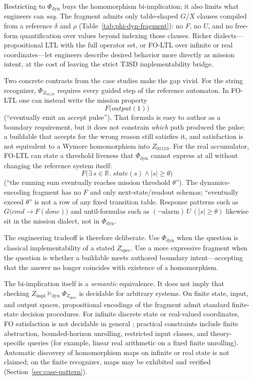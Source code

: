 Restricting to $\Phi_{\mathrm{dyn}}$ buys the homomorphism bi-implication; it also limits what engineers can \emph{say}. The fragment admits only table-shaped $G$/$X$ clauses compiled from a reference $\delta$ and $\rho$ (Table~\ref{tab:phi-dyn-fragment}): no $F$, no $U$, and no free-form quantification over values beyond indexing those clauses. Richer dialects---propositional LTL with the full operator set, or FO-LTL over infinite or real coordinates---let engineers describe desired behavior more directly as mission intent, at the cost of leaving the strict T3SD implementability bridge.

Two concrete contrasts from the case studies make the gap vivid. For the string recognizer, $\Phi_{Z_{01110}}$ requires every guided step of the reference automaton. In FO-LTL one can instead write the mission property
\[
  F\bigl(\mathit{output}(1)\bigr)
\]
(``eventually emit an accept pulse''). That formula is easy to author as a boundary requirement, but it does not constrain \emph{which} path produced the pulse: a buildable that accepts for the wrong reason still satisfies it, and satisfaction is not equivalent to a Wymore homomorphism into $Z_{01110}$. For the real accumulator, FO-LTL can state a threshold liveness that $\Phi_{\mathrm{dyn}}$ cannot express at all without changing the reference system itself:
\[
  F\bigl(\exists\, s\in\mathbb{R}.\; \mathit{state}(s)\wedge |s|\ge\theta\bigr)
\]
(``the running sum eventually reaches mission threshold $\theta$''). The dynamics-encoding fragment has no $F$ and only next-state/readout schemas; ``eventually exceed $\theta$'' is not a row of any fixed transition table. Response patterns such as $G\bigl(\mathit{cmd}\rightarrow F(\mathit{done})\bigr)$ and until-formulas such as $(\neg\mathrm{alarm})\,U\,(|s|\ge\theta)$ likewise sit in the mission dialect, not in $\Phi_{\mathrm{dyn}}$.

The engineering tradeoff is therefore deliberate. Use $\Phi_{\mathrm{dyn}}$ when the question is classical implementability of a stated $Z_{\text{spec}}$. Use a more expressive fragment when the question is whether a buildable meets authored boundary intent---accepting that the answer no longer coincides with existence of a homomorphism.

The bi-implication itself is a \emph{semantic} equivalence. It does not imply that checking $Z_{\text{impl}} \models_{\mathrm{dyn}} \Phi_{Z_{\text{spec}}}$ is decidable for arbitrary systems. On finite state, input, and output spaces, propositional encodings of the fragment admit standard finite-state decision procedures. For infinite discrete state or real-valued coordinates, FO satisfaction is not decidable in general \citep{BaierKatoen2008}; practical constraints include finite abstraction, bounded-horizon unrolling, restricted input classes, and theory-specific queries (for example, linear real arithmetic on a fixed finite unrolling). Automatic discovery of homomorphism maps on infinite or real state is not claimed; on the finite recognizer, maps may be exhibited and verified (Section~\ref{sec:case-pattern}).

